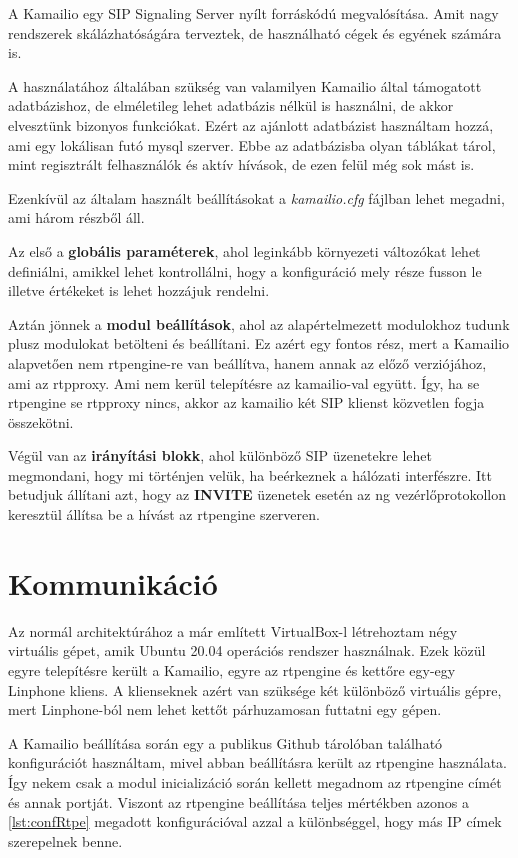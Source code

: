 A Kamailio egy SIP Signaling Server nyílt forráskódú megvalósítása. Amit nagy rendszerek
skálázhatóságára terveztek, de használható cégek és egyének számára is.

A használatához általában szükség van valamilyen Kamailio által támogatott adatbázishoz,
de elméletileg lehet adatbázis nélkül is használni, de akkor elvesztünk bizonyos funkciókat. 
Ezért az ajánlott adatbázist használtam hozzá, ami egy lokálisan futó mysql szerver. Ebbe 
az adatbázisba olyan táblákat tárol, mint regisztrált felhasználók és aktív hívások, de 
ezen felül még sok mást is. 

Ezenkívül az általam használt beállításokat a \textit{kamailio.cfg} fájlban lehet megadni,
ami három részből áll. 

Az első a \textbf{globális paraméterek}, ahol leginkább környezeti változókat lehet 
definiálni, amikkel lehet kontrollálni, hogy a konfiguráció mely része fusson le illetve
értékeket is lehet hozzájuk rendelni. 

Aztán jönnek a \textbf{modul beállítások}, ahol az alapértelmezett modulokhoz tudunk plusz
modulokat betölteni és beállítani. Ez azért egy fontos rész, mert a Kamailio alapvetően 
nem rtpengine-re van beállítva, hanem annak az előző verziójához, ami az rtpproxy. Ami 
nem kerül telepítésre az kamailio-val együtt. Így, ha se rtpengine se rtpproxy nincs,
akkor az kamailio két SIP klienst közvetlen fogja összekötni.

Végül van az \textbf{irányítási blokk}, ahol különböző SIP üzenetekre lehet megmondani, hogy mi
történjen velük, ha beérkeznek a hálózati interfészre. Itt betudjuk állítani azt, hogy
az \textbf{INVITE} üzenetek esetén az ng vezérlőprotokollon keresztül állítsa be a hívást
az rtpengine szerveren.

\section{Kommunikáció}

Az normál architektúrához a már említett VirtualBox-l létrehoztam négy virtuális gépet,
amik Ubuntu 20.04 operációs rendszer használnak. Ezek közül egyre telepítésre került 
a Kamailio, egyre az rtpengine és kettőre egy-egy Linphone kliens. A klienseknek azért
van szüksége két különböző virtuális gépre, mert Linphone-ból nem lehet kettőt
párhuzamosan futtatni egy gépen.

A Kamailio beállítása során egy a publikus Github tárolóban található konfigurációt
használtam, mivel abban beállításra került az rtpengine használata. Így nekem 
csak a modul inicializáció során kellett megadnom az rtpengine címét és annak portját. 
Viszont az rtpengine beállítása teljes mértékben azonos a \ref{lst:confRtpe} megadott konfigurációval azzal a különbséggel, hogy más IP címek szerepelnek benne.

